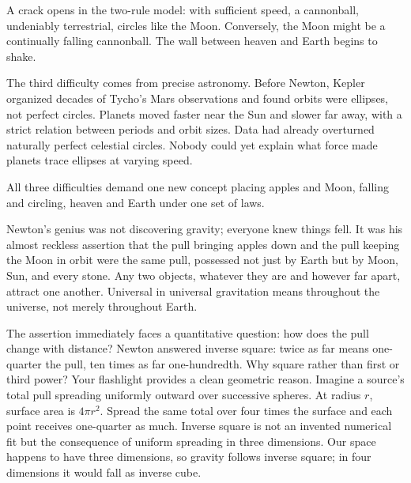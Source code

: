 A crack opens in the two-rule model: with sufficient speed, a cannonball, undeniably terrestrial, circles like the Moon. Conversely, the Moon might be a continually falling cannonball. The wall between heaven and Earth begins to shake.

The third difficulty comes from precise astronomy. Before Newton, Kepler organized decades of Tycho's Mars observations and found orbits were ellipses, not perfect circles. Planets moved faster near the Sun and slower far away, with a strict relation between periods and orbit sizes. Data had already overturned naturally perfect celestial circles. Nobody could yet explain what force made planets trace ellipses at varying speed.

All three difficulties demand one new concept placing apples and Moon, falling and circling, heaven and Earth under one set of laws.


Newton's genius was not discovering gravity; everyone knew things fell. It was his almost reckless assertion that the pull bringing apples down and the pull keeping the Moon in orbit were the same pull, possessed not just by Earth but by Moon, Sun, and every stone. Any two objects, whatever they are and however far apart, attract one another. Universal in universal gravitation means throughout the universe, not merely throughout Earth.

The assertion immediately faces a quantitative question: how does the pull change with distance? Newton answered inverse square: twice as far means one-quarter the pull, ten times as far one-hundredth. Why square rather than first or third power? Your flashlight provides a clean geometric reason. Imagine a source's total pull spreading uniformly outward over successive spheres. At radius \(r\), surface area is \(4\pi r^{2}\). Spread the same total over four times the surface and each point receives one-quarter as much. Inverse square is not an invented numerical fit but the consequence of uniform spreading in three dimensions. Our space happens to have three dimensions, so gravity follows inverse square; in four dimensions it would fall as inverse cube.

\begin{center}
\end{center}

